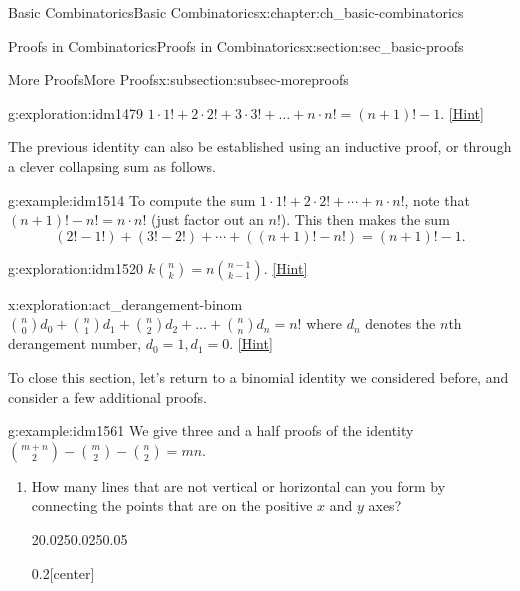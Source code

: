 \documentclass[oneside,10pt,]{book}
\numberwithin{equation}{chapter}
\begin{document}
\begin{chapterptx}{Basic Combinatorics}{}{Basic Combinatorics}{}{}{x:chapter:ch_basic-combinatorics}
\begin{sectionptx}{Proofs in Combinatorics}{}{Proofs in Combinatorics}{}{}{x:section:sec_basic-proofs}
\begin{subsectionptx}{More Proofs}{}{More Proofs}{}{}{x:subsection:subsec-moreproofs}
\begin{exploration}{}{g:exploration:idm1479}
\(1 \cdot 1! + 2 \cdot 2! + 3 \cdot 3! + \ldots + n \cdot n! = \left( n + 1 \right)! - 1\).%
\space\hspace*{0pt}\hfill{\tiny\hyperlink{g:hint:idm1483-back}{[Hint]}}\end{exploration}
The previous identity can also be established using an inductive proof, or through a clever collapsing sum as follows.%
\begin{example}{}{g:example:idm1514}%
To compute the sum \(1\cdot 1! + 2 \cdot 2! + \cdots + n \cdot n!\), note that \((n+1)! - n! = n\cdot n!\) (just factor out an \(n!\)).  This then makes the sum%
\begin{equation*}
(2! - 1!) + (3! - 2!) + \cdots + ((n+1)! - n!) = (n+1)! - 1 \text{.}
\end{equation*}
%
\end{example}
\begin{exploration}{}{g:exploration:idm1520}%
\(k \binom{n}{k} = n \binom{n - 1}{k - 1}\).%
\space\hspace*{0pt}\hfill{\tiny\hyperlink{g:hint:idm1524-back}{[Hint]}}\end{exploration}
\begin{exploration}{}{x:exploration:act_derangement-binom}%
\(\binom{n}{0} d_{0} + \binom{n}{1} d_{1} + \binom{n}{2} d_{2} + \ldots + \binom{n}{n} d_{n} = n!\) where \(d_{n}\) denotes the \(n\)th derangement number, \(d_{0} = 1,d_{1} = 0\).%
\space\hspace*{0pt}\hfill{\tiny\hyperlink{g:hint:idm1547-back}{[Hint]}}\end{exploration}
To close this section, let's return to a binomial identity we considered before, and consider a few additional proofs.%
\begin{example}{}{g:example:idm1561}%
We give three and a half proofs of the identity \(\binom{m + n}{2} - \binom{m}{2} - \binom{n}{2} = mn\).%
\begin{enumerate}
\item{}How many lines that are not vertical or horizontal can you form by connecting the points that are on the positive \(x\) and \(y\) axes?%
\begin{sidebyside}{2}{0.025}{0.025}{0.05}%
\begin{sbspanel}{0.2}[center]%
\end{sbspanel}
\end{sidebyside}
\end{enumerate}
\end{example}
\end{subsectionptx}
\end{sectionptx}
\end{chapterptx}
\end{document}
